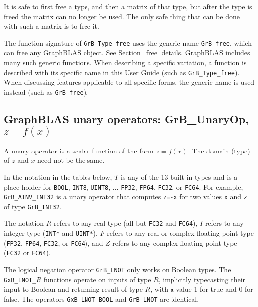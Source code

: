 \documentclass[12pt]{article}
\begin{document}
It is safe to first free a type, and then a matrix of that type, but after the
type is freed the matrix can no longer be used.  The only safe thing that can
be done with such a matrix is to free it.

The function signature of \verb'GrB_Type_free' uses the generic name
\verb'GrB_free', which can free any GraphBLAS object. See Section~\ref{free}
details.  GraphBLAS includes many such generic functions.  When describing a
specific variation, a function is described with its specific name in this User
Guide (such as \verb'GrB_Type_free').  When discussing features applicable to
all specific forms, the generic name is used instead (such as \verb'GrB_free').

\newpage
\subsection{GraphBLAS unary operators: {\sf GrB\_UnaryOp}, $z=f(x)$} %
\label{unaryop}

A unary operator is a scalar function of the form $z=f(x)$.  The domain (type)
of $z$ and $x$ need not be the same.

In the notation in the tables
below, $T$ is any of the 13 built-in types and is a place-holder for
\verb'BOOL', \verb'INT8', \verb'UINT8', ... 
\verb'FP32', \verb'FP64', \verb'FC32', or \verb'FC64'.
For example, \verb'GrB_AINV_INT32' is a unary operator that computes
\verb'z=-x' for two values \verb'x' and \verb'z' of type \verb'GrB_INT32'.

The notation $R$ refers to any real type (all but \verb'FC32' and \verb'FC64'),
$I$ refers to any integer type (\verb'INT*' and \verb'UINT*'),
$F$ refers to any real or complex floating point type
(\verb'FP32', \verb'FP64', \verb'FC32', or \verb'FC64'),
and $Z$ refers to any complex floating point type
(\verb'FC32' or \verb'FC64').

The logical negation operator \verb'GrB_LNOT' only works on Boolean types.  The
\verb'GxB_LNOT_'$R$ functions operate on inputs of type $R$, implicitly
typecasting their input to Boolean and returning result of type $R$, with a
value 1 for true and 0 for false.  The operators \verb'GxB_LNOT_BOOL' and
\verb'GrB_LNOT' are identical.
\end{document}
